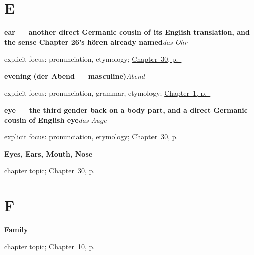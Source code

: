 \section*{E}

\noindent\begin{minipage}[t]{\linewidth}
\raggedright
\textbf{ear — another direct Germanic cousin of its English translation, and the sense Chapter 26's hören already named}\enspace\emph{das Ohr}\par
\footnotesize explicit focus: pronunciation, etymology; \hyperref[ch:ge-face-parts]{Chapter~30, p.~\pageref*{ch:ge-face-parts}}
\end{minipage}\par\smallskip

\noindent\begin{minipage}[t]{\linewidth}
\raggedright
\textbf{evening (der Abend — masculine)}\enspace\emph{Abend}\par
\footnotesize explicit focus: pronunciation, grammar, etymology; \hyperref[ch:greetings]{Chapter~1, p.~\pageref*{ch:greetings}}
\end{minipage}\par\smallskip

\noindent\begin{minipage}[t]{\linewidth}
\raggedright
\textbf{eye — the third gender back on a body part, and a direct Germanic cousin of English eye}\enspace\emph{das Auge}\par
\footnotesize explicit focus: pronunciation, etymology; \hyperref[ch:ge-face-parts]{Chapter~30, p.~\pageref*{ch:ge-face-parts}}
\end{minipage}\par\smallskip

\noindent\begin{minipage}[t]{\linewidth}
\raggedright
\textbf{Eyes, Ears, Mouth, Nose}\par
\footnotesize chapter topic; \hyperref[ch:ge-face-parts]{Chapter~30, p.~\pageref*{ch:ge-face-parts}}
\end{minipage}\par\smallskip

\section*{F}

\noindent\begin{minipage}[t]{\linewidth}
\raggedright
\textbf{Family}\par
\footnotesize chapter topic; \hyperref[ch:family]{Chapter~10, p.~\pageref*{ch:family}}
\end{minipage}\par\smallskip

